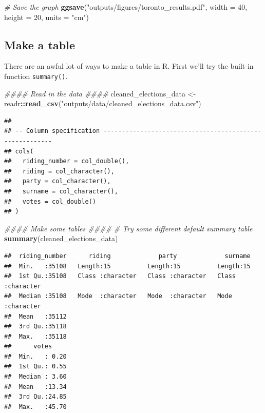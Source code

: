 \documentclass[
]{book}
\newenvironment{Shaded}{\begin{snugshade}}{\end{snugshade}}
\newcommand{\CommentTok}[1]{\textcolor[rgb]{0.56,0.35,0.01}{\textit{#1}}}
\newcommand{\DataTypeTok}[1]{\textcolor[rgb]{0.13,0.29,0.53}{#1}}
\newcommand{\DecValTok}[1]{\textcolor[rgb]{0.00,0.00,0.81}{#1}}
\newcommand{\KeywordTok}[1]{\textcolor[rgb]{0.13,0.29,0.53}{\textbf{#1}}}
\newcommand{\NormalTok}[1]{#1}
\newcommand{\OperatorTok}[1]{\textcolor[rgb]{0.81,0.36,0.00}{\textbf{#1}}}
\newcommand{\StringTok}[1]{\textcolor[rgb]{0.31,0.60,0.02}{#1}}
\begin{document}
\begin{Shaded}
\begin{Highlighting}[]
\CommentTok{# Save the graph}
\KeywordTok{ggsave}\NormalTok{(}\StringTok{"outputs/figures/toronto_results.pdf"}\NormalTok{, }\DataTypeTok{width =} \DecValTok{40}\NormalTok{, }\DataTypeTok{height =} \DecValTok{20}\NormalTok{, }\DataTypeTok{units =} \StringTok{"cm"}\NormalTok{)}
\end{Highlighting}
\end{Shaded}

\hypertarget{make-a-table}{%
\subsection{Make a table}\label{make-a-table}}

There are an awful lot of ways to make a table in R. First we'll try the built-in function \texttt{summary()}.

\begin{Shaded}
\begin{Highlighting}[]
\CommentTok{#### Read in the data ####}
\NormalTok{cleaned_elections_data <-}\StringTok{ }
\StringTok{  }\NormalTok{readr}\OperatorTok{::}\KeywordTok{read_csv}\NormalTok{(}\StringTok{"outputs/data/cleaned_elections_data.csv"}\NormalTok{)}
\end{Highlighting}
\end{Shaded}

\begin{verbatim}
## 
## -- Column specification --------------------------------------------------------
## cols(
##   riding_number = col_double(),
##   riding = col_character(),
##   party = col_character(),
##   surname = col_character(),
##   votes = col_double()
## )
\end{verbatim}

\begin{Shaded}
\begin{Highlighting}[]
\CommentTok{#### Make some tables ####}
\CommentTok{# Try some different default summary table}
\KeywordTok{summary}\NormalTok{(cleaned_elections_data)}
\end{Highlighting}
\end{Shaded}

\begin{verbatim}
##  riding_number      riding             party             surname         
##  Min.   :35108   Length:15          Length:15          Length:15         
##  1st Qu.:35108   Class :character   Class :character   Class :character  
##  Median :35108   Mode  :character   Mode  :character   Mode  :character  
##  Mean   :35112                                                           
##  3rd Qu.:35118                                                           
##  Max.   :35118                                                           
##      votes      
##  Min.   : 0.20  
##  1st Qu.: 0.55  
##  Median : 3.60  
##  Mean   :13.34  
##  3rd Qu.:24.85  
##  Max.   :45.70
\end{verbatim}
\end{document}
